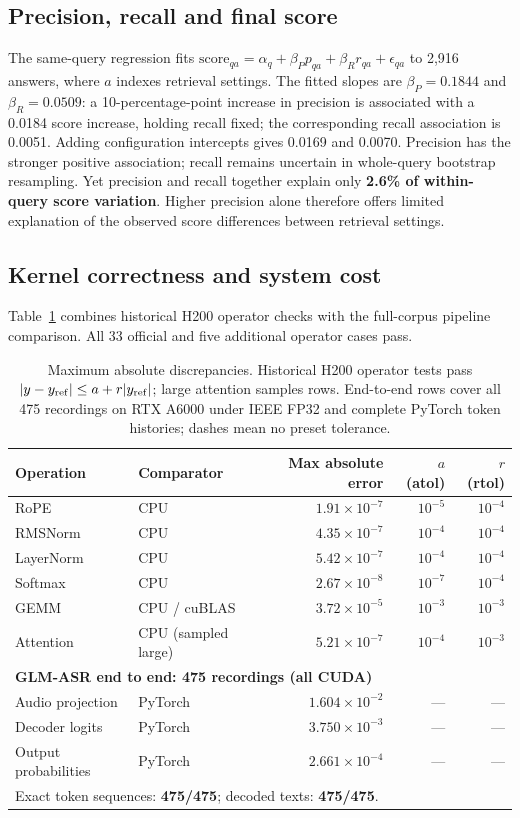\documentclass{article}
\begin{document}
\subsection{Precision, recall and final score}
The same-query regression fits $\mathrm{score}_{qa}=\alpha_q+\beta_Pp_{qa}+\beta_Rr_{qa}+\epsilon_{qa}$ to 2,916 answers, where $a$ indexes retrieval settings. The fitted slopes are $\beta_P=0.1844$ and $\beta_R=0.0509$: a 10-percentage-point increase in precision is associated with a 0.0184 score increase, holding recall fixed; the corresponding recall association is 0.0051. Adding configuration intercepts gives 0.0169 and 0.0070. Precision has the stronger positive association; recall remains uncertain in whole-query bootstrap resampling. Yet precision and recall together explain only \textbf{2.6\% of within-query score variation}. Higher precision alone therefore offers limited explanation of the observed score differences between retrieval settings.

\subsection{Kernel correctness and system cost}\label{sec:asr}
Table~\ref{tab:kernel-errors} combines historical H200 operator checks with the full-corpus pipeline comparison. All 33 official and five additional operator cases pass.

\begin{table}[h]
\centering
\caption{Maximum absolute discrepancies. Historical H200 operator tests pass $|y-y_{\rm ref}|\leq a+r|y_{\rm ref}|$; large attention samples rows. End-to-end rows cover all 475 recordings on RTX A6000 under IEEE FP32 and complete PyTorch token histories; dashes mean no preset tolerance.}
\label{tab:kernel-errors}
\small
\begin{tabular}{llrrr}
\toprule
Operation & Comparator & Max absolute error & $a$ (atol) & $r$ (rtol)\\
\midrule
RoPE & CPU & $1.91\times10^{-7}$ & $10^{-5}$ & $10^{-4}$\\
RMSNorm & CPU & $4.35\times10^{-7}$ & $10^{-4}$ & $10^{-4}$\\
LayerNorm & CPU & $5.42\times10^{-7}$ & $10^{-4}$ & $10^{-4}$\\
Softmax & CPU & $2.67\times10^{-8}$ & $10^{-7}$ & $10^{-4}$\\
GEMM & CPU / cuBLAS & $3.72\times10^{-5}$ & $10^{-3}$ & $10^{-3}$\\
Attention & CPU (sampled large) & $5.21\times10^{-7}$ & $10^{-4}$ & $10^{-3}$\\
\midrule
\multicolumn{5}{l}{\textbf{GLM-ASR end to end: 475 recordings (all CUDA)}}\\
Audio projection & PyTorch & $1.604\times10^{-2}$ & --- & ---\\
Decoder logits & PyTorch & $3.750\times10^{-3}$ & --- & ---\\
Output probabilities & PyTorch & $2.661\times10^{-4}$ & --- & ---\\
\multicolumn{5}{l}{Exact token sequences: \textbf{475/475}; decoded texts: \textbf{475/475}.}\\
\bottomrule
\end{tabular}
\end{table}
\end{document}
